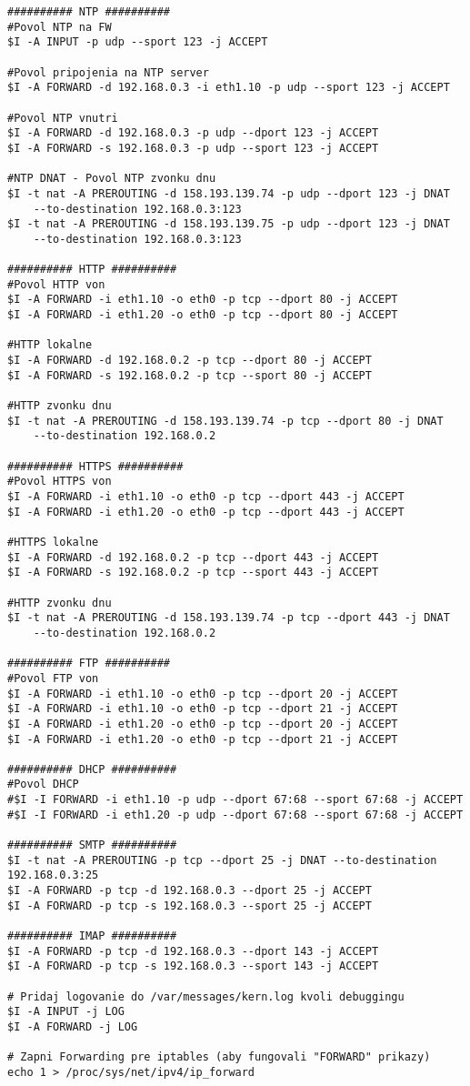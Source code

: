 {\begin{small}
\begin{verbatim}
########## NTP ##########
#Povol NTP na FW
$I -A INPUT -p udp --sport 123 -j ACCEPT

#Povol pripojenia na NTP server
$I -A FORWARD -d 192.168.0.3 -i eth1.10 -p udp --sport 123 -j ACCEPT

#Povol NTP vnutri
$I -A FORWARD -d 192.168.0.3 -p udp --dport 123 -j ACCEPT
$I -A FORWARD -s 192.168.0.3 -p udp --sport 123 -j ACCEPT

#NTP DNAT - Povol NTP zvonku dnu
$I -t nat -A PREROUTING -d 158.193.139.74 -p udp --dport 123 -j DNAT 
	--to-destination 192.168.0.3:123
$I -t nat -A PREROUTING -d 158.193.139.75 -p udp --dport 123 -j DNAT 
	--to-destination 192.168.0.3:123

########## HTTP ##########
#Povol HTTP von
$I -A FORWARD -i eth1.10 -o eth0 -p tcp --dport 80 -j ACCEPT
$I -A FORWARD -i eth1.20 -o eth0 -p tcp --dport 80 -j ACCEPT

#HTTP lokalne
$I -A FORWARD -d 192.168.0.2 -p tcp --dport 80 -j ACCEPT
$I -A FORWARD -s 192.168.0.2 -p tcp --sport 80 -j ACCEPT

#HTTP zvonku dnu
$I -t nat -A PREROUTING -d 158.193.139.74 -p tcp --dport 80 -j DNAT 
	--to-destination 192.168.0.2

########## HTTPS ##########
#Povol HTTPS von
$I -A FORWARD -i eth1.10 -o eth0 -p tcp --dport 443 -j ACCEPT
$I -A FORWARD -i eth1.20 -o eth0 -p tcp --dport 443 -j ACCEPT

#HTTPS lokalne
$I -A FORWARD -d 192.168.0.2 -p tcp --dport 443 -j ACCEPT
$I -A FORWARD -s 192.168.0.2 -p tcp --sport 443 -j ACCEPT

#HTTP zvonku dnu
$I -t nat -A PREROUTING -d 158.193.139.74 -p tcp --dport 443 -j DNAT 
	--to-destination 192.168.0.2

########## FTP ##########
#Povol FTP von
$I -A FORWARD -i eth1.10 -o eth0 -p tcp --dport 20 -j ACCEPT
$I -A FORWARD -i eth1.10 -o eth0 -p tcp --dport 21 -j ACCEPT
$I -A FORWARD -i eth1.20 -o eth0 -p tcp --dport 20 -j ACCEPT
$I -A FORWARD -i eth1.20 -o eth0 -p tcp --dport 21 -j ACCEPT

########## DHCP ##########
#Povol DHCP
#$I -I FORWARD -i eth1.10 -p udp --dport 67:68 --sport 67:68 -j ACCEPT
#$I -I FORWARD -i eth1.20 -p udp --dport 67:68 --sport 67:68 -j ACCEPT

########## SMTP ##########
$I -t nat -A PREROUTING -p tcp --dport 25 -j DNAT --to-destination 192.168.0.3:25
$I -A FORWARD -p tcp -d 192.168.0.3 --dport 25 -j ACCEPT
$I -A FORWARD -p tcp -s 192.168.0.3 --sport 25 -j ACCEPT

########## IMAP ##########
$I -A FORWARD -p tcp -d 192.168.0.3 --dport 143 -j ACCEPT
$I -A FORWARD -p tcp -s 192.168.0.3 --sport 143 -j ACCEPT

# Pridaj logovanie do /var/messages/kern.log kvoli debuggingu
$I -A INPUT -j LOG
$I -A FORWARD -j LOG

# Zapni Forwarding pre iptables (aby fungovali "FORWARD" prikazy)
echo 1 > /proc/sys/net/ipv4/ip_forward

\end{verbatim}

\end{small}

}

